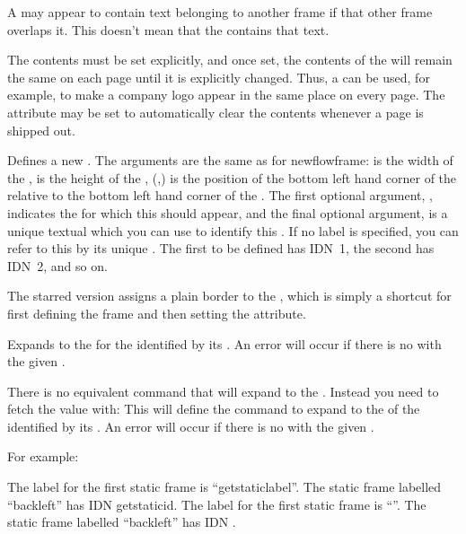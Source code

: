 \documentclass[fontsize=12pt]{scrbook}
\newcommand{\frameoptval}[2]{\optval{frame.#1}{#2}}
\begin{document}
\begin{information}
A  may appear to contain text belonging to another
frame if that other frame overlaps it. This doesn't mean that the
 contains that text.
\end{information}
  
The contents must be set explicitly, and once set, the contents 
of the  will remain the same on each page until it is 
explicitly changed.  Thus, a  can be used, for 
example, to make a company logo appear in the same place on every 
page. The  attribute may be set to automatically
clear the contents whenever a page is shipped out.

Defines a new . The arguments are the same as for
\gls{newflowframe}:  is the width of 
the ,  is the height of the ,
(,) is the position of the bottom left hand 
corner of the  relative to the bottom left hand 
corner of the . The first optional argument,
, indicates the  for which this
 should appear, and the final optional argument,
 is a unique textual  which you can use to
identify this .  If no label is specified, you
can refer to this  by its unique .
The first  to be defined has \gls*{IDN}~1, the second
has \gls*{IDN}~2, and so on. 

The starred version assigns a plain border to the ,
which is simply a shortcut for first defining the frame and then
setting the \frameoptval{border}{plain} attribute.

Expands to the  for the  identified by its
. An error will occur if there is no  with
the given .

There is no equivalent command that will expand to the .
Instead you need to fetch the value with:
This will define the command  to expand to the  of the
 identified by its . An error will occur if
there is no  with the given .

For example:
\begin{coderesult}[before upper app=\footnotesize]
The label for the first 
static frame is 
``\gls{getstaticlabel}''.
The static frame labelled 
``backleft'' has IDN
\gls{getstaticid}.
\tcblower
The label for the first static frame is ``''.
The static frame labelled ``backleft'' has IDN
\myid.
\end{coderesult}
\end{document}
